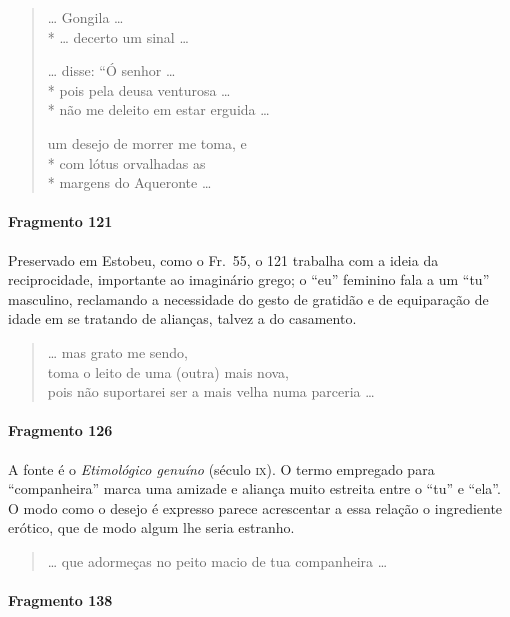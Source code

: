 \begin{verse}
\ldots{} Gongila \ldots{}\\*
\ldots{} decerto um sinal \ldots{}

\ldots{} disse: “Ó senhor \ldots{}\\*
pois pela deusa venturosa \ldots{}\\*
não me deleito em estar erguida \ldots{}

um desejo de morrer me toma, e\\*
com lótus orvalhadas as\\*
margens do Aqueronte \ldots{}
\end{verse}


\paragraph{Fragmento 121}

{\small Preservado em Estobeu, como o Fr.~55, o 121 trabalha com a ideia da
reciprocidade, importante ao imaginário grego; o “eu” feminino fala a um “tu”
masculino, reclamando a necessidade do gesto de gratidão e de equiparação de
idade em se tratando de alianças, talvez a do casamento.}

\pagebreak

\begin{verse}
\ldots{} mas grato me sendo,\\
toma o leito de uma (outra) mais nova, \\
pois não suportarei ser a mais velha numa parceria \ldots{}
\end{verse}


\paragraph{Fragmento 126}

{\small A fonte é o \textit{Etimológico genuíno }(século \textsc{ix}). O termo empregado para
“companheira” marca uma amizade e aliança muito estreita entre o “tu”
e “ela”. O modo como o desejo é expresso parece acrescentar a essa relação o
ingrediente erótico, que de modo algum lhe seria estranho.}

\begin{verse}
\ldots{} que adormeças no peito macio de tua companheira \ldots{} 
\end{verse}


\paragraph{Fragmento 138}

